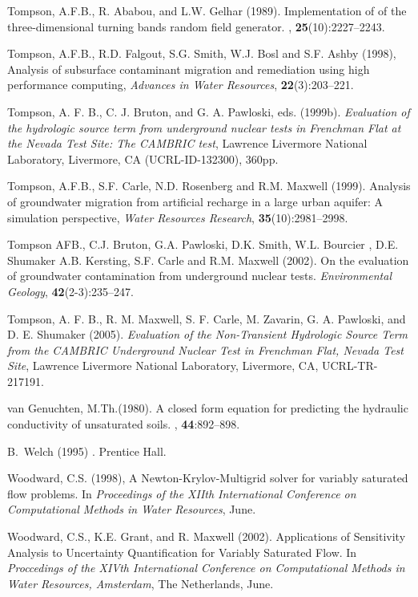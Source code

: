 \begin{thebibliography}{99}
Tompson, A.F.B., R. Ababou, and L.W. Gelhar (1989).
\newblock Implementation of of the three-dimensional turning bands random field
  generator.
, {\bf 25}(10):2227--2243.

  Tompson, A.F.B., R.D. Falgout, S.G. Smith, W.J. Bosl and
S.F. Ashby (1998), Analysis of subsurface contaminant migration and
remediation using high performance computing, {\em Advances in Water
Resources}, { \bf 22}(3):203--221.

Tompson, A. F. B., C. J. Bruton, and G. A. Pawloski, eds. (1999b). {\em Evaluation of the hydrologic source term from underground nuclear tests in Frenchman Flat at the Nevada Test Site: The CAMBRIC test}, Lawrence Livermore National Laboratory, Livermore, CA (UCRL-ID-132300), 360pp. 

  Tompson, A.F.B., S.F. Carle, N.D. Rosenberg and R.M. Maxwell
 (1999). Analysis of groundwater migration from artificial recharge in a large
 urban aquifer: A simulation perspective, {\em Water Resources
Research}, {\bf 35}(10):2981--2998.

Tompson AFB., C.J. Bruton, G.A. Pawloski, D.K. Smith, W.L. Bourcier , D.E. Shumaker A.B. Kersting, S.F. Carle and R.M. Maxwell (2002). On the evaluation of groundwater contamination from underground nuclear tests.  {\em Environmental Geology}, {\bf 42}(2-3):235--247.

Tompson, A. F. B., R. M. Maxwell, S. F. Carle, M. Zavarin, G. A. Pawloski, and D. E. Shumaker (2005). {\em Evaluation of the Non-Transient Hydrologic Source Term from the CAMBRIC Underground Nuclear Test in Frenchman Flat, Nevada Test Site}, Lawrence Livermore National Laboratory, Livermore, CA, UCRL-TR-217191.

{van Genuchten}, M.Th.(1980). 
\newblock A closed form equation for predicting the hydraulic conductivity of
  unsaturated soils.
, {\bf 44}:892--898.

B.~Welch (1995)
.
\newblock Prentice Hall.

Woodward, C.S. (1998),
\newblock A {N}ewton-{K}rylov-{M}ultigrid solver for variably saturated flow
  problems.
\newblock In {\em Proceedings of the XIIth International Conference on
  Computational Methods in Water Resources}, June.

Woodward, C.S., K.E. Grant, and R. Maxwell (2002). Applications of Sensitivity Analysis to Uncertainty Quantification for Variably Saturated Flow.
\newblock In {\em Proccedings of the XIVth International Conference on Computational Methods in Water Resources, Amsterdam}, The Netherlands, June.

\end{thebibliography}
